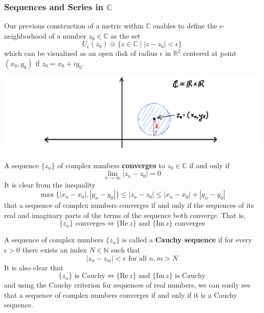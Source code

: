 \documentclass{article}
\begin{document}
    \subsubsection[Sequences and Series in C]{Sequences and Series in $\mathbb{C}$}
    Our previous construction of a metric within $\mathbb{C}$ enables to define the $\epsilon$-neighborhood of a number $z_0 \in \mathbb{C}$ as the set
    \[U_\epsilon (z_0) \equiv \{z \in \mathbb{C}\;|\; |z - z_0| < \epsilon\}\]
    which can be visualized as an open disk of radius $\epsilon$ in $\mathbb{R}^2$ centered at point $(x_0, y_0)$ if $z_0 = x_0 + i y_0$. 
    \begin{center}
        \includegraphics[scale=0.25]{img/Epsilon_Neighborhood_in_C.jpg}
    \end{center}

    \begin{definition}
      A sequence $\{z_n\}$ of complex numbers \textbf{converges} to $z_0 \in \mathbb{C}$ if and only if 
      \[\lim_{n \rightarrow \infty} |z_n - z_0| = 0\]
      It is clear from the inequality
      \[\max\{|x_n - x_0|, |y_n - y_0|\} \leq |z_n - z_0| \leq |x_n - x_0| + |y_n - y_0|\]
      that a sequence of complex numbers converges if and only if the sequences of its real and imaginary parts of the terms of the sequence both converge. That is, 
      \[\{z_n\} \text{ converges} \iff \{\text{Re}\,z\} \text{ and } \{\text{Im}\,z\} \text{ converges}\]
    \end{definition}

    \begin{lemma}
      A sequence of complex numbers $\{z_n\}$ is called a \textbf{Cauchy sequence} if for every $\epsilon>0$ there exists an index $N \in \mathbb{N}$ such that
      \[|z_n - z_m|<\epsilon \text{ for all } n, m > N\]
      It is also clear that 
      \[\{z_n\} \text{ is Cauchy} \iff \{\text{Re}\,z\} \text{ and } \{\text{Im}\,z\} \text{ is Cauchy}\]
      and using the Cauchy criterion for sequences of real numbers, we can easily see that a sequence of complex numbers converges if and only if it is a Cauchy sequence. 
    \end{lemma}
\end{document}
